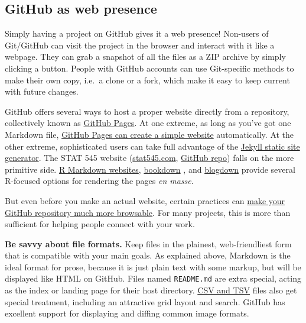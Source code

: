 \documentclass[12pt]{article}
\begin{document}
\subsection{GitHub as web presence}\label{github-as-web-presence}

Simply having a project on GitHub gives it a web presence! Non-users of
Git/GitHub can visit the project in the browser and interact with it
like a webpage. They can grab a snapshot of all the files as a ZIP
archive by simply clicking a button. People with GitHub accounts can use
Git-specific methods to make their own copy, i.e.~a clone or a fork,
which make it easy to keep current with future changes.

GitHub offers several ways to host a proper website directly from a
repository, collectively known as
\href{https://help.github.com/categories/github-pages-basics/}{GitHub
Pages}. At one extreme, as long as you've got one Markdown file,
\href{https://github.com/blog/2289-publishing-with-github-pages-now-as-easy-as-1-2-3}{GitHub
Pages can create a simple website} automatically. At the other extreme,
sophisticated users can take full advantage of the
\href{https://jekyllrb.com}{Jekyll static site generator}. The STAT 545
website (\href{http://stat545.com}{stat545.com},
\href{https://github.com/STAT545-UBC/STAT545-UBC.github.io}{GitHub
repo}) falls on the more primitive side.
\href{http://rmarkdown.rstudio.com/rmarkdown_websites.html}{R Markdown
websites}, \href{https://bookdown.org}{bookdown}
\citep{bookdown-pkg, bookdown-book}, and
\href{https://bookdown.org/yihui/blogdown/}{blogdown} provide several
R-focused options for rendering the pages \emph{en masse}.

But even before you make an actual website, certain practices can
\href{http://happygitwithr.com/repo-browsability.html}{make your GitHub
repository much more browsable}. For many projects, this is more than
sufficient for helping people connect with your work.

\textbf{Be savvy about file formats.} Keep files in the plainest,
web-friendliest form that is compatible with your main goals. As
explained above, Markdown is the ideal format for prose, because it is
just plain text with some markup, but will be displayed like HTML on
GitHub. Files named \texttt{README.md} are extra special, acting as the
index or landing page for their host directory.
\href{https://help.github.com/articles/rendering-csv-and-tsv-data/}{CSV
and TSV} files also get special treatment, including an attractive grid
layout and search. GitHub has excellent support for displaying and
diffing common image formats.
\end{document}

